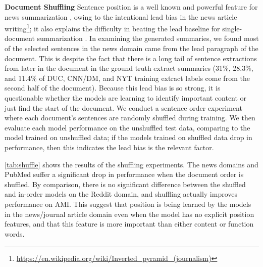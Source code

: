

\textbf{Document Shuffling} Sentence position is a well known and 
powerful feature for news summarization \cite{hong2014improving}, owing 
to the intentional lead bias in the news article writing\footnote{\url{https://en.wikipedia.org/wiki/Inverted_pyramid_(journalism)}}; it also explains the difficulty in beating
the lead baseline for single-document summarization 
\cite{nenkova2005automatic,rau:1999}.
In examining the generated summaries, we found
most of the selected sentences in the news domain came from the lead paragraph
of the document. This is despite the fact that there is a long tail of 
sentence extractions from later in the document in the ground truth extract 
summaries (31\%, 28.3\%, and 11.4\% of DUC, CNN/DM, and NYT training extract labels come 
from the second half of the document). 
Because this lead bias is so strong, it is questionable whether
the models are learning to identify important content or just find the start
of the document. We conduct a sentence order experiment where 
each document's sentences are randomly shuffled during training. We then
evaluate each model performance on the unshuffled test data, comparing to 
the model trained on unshuffled data; if the models trained on shuffled data
drop in performance, then this indicates the lead bias is the relevant factor.

\autoref{tab:shuffle} shows the results
of the shuffling experiments. 
The news domains and PubMed suffer a significant drop in performance 
when the document order is shuffled. By comparison, there is no significant difference between the shuffled and in-order models on 
the Reddit domain, and shuffling actually improves performance on AMI.
This suggest that position 
is being learned by the models in the news/journal article domain even when 
the model has no explicit position features, and that this feature is more 
important than either content or function words.











